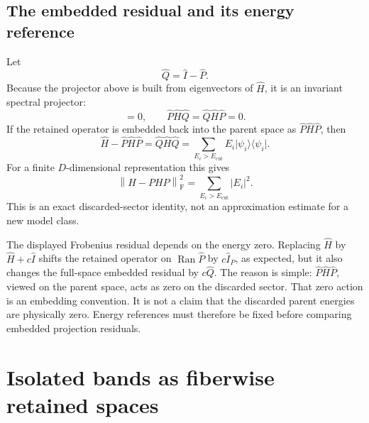 \subsection{The embedded residual and its energy reference}

Let
\begin{equation}
  \hat Q=\hat I-\hat P.
\end{equation}
Because the projector above is built from eigenvectors of \(\hat H\), it is an
invariant spectral projector:
\begin{equation}
  [\hat P,\hat H]=0,
  \qquad
  \hat P\hat H\hat Q=\hat Q\hat H\hat P=0.
\end{equation}
If the retained operator is embedded back into the parent space as
\(\hat P\hat H\hat P\), then
\begin{equation}
  \hat H-\hat P\hat H\hat P
  =\hat Q\hat H\hat Q
  =\sum_{E_i>E_{\mathrm{cut}}}
    E_i\lvert\psi_i\rangle\langle\psi_i\rvert.
\end{equation}
For a finite \(D\)-dimensional representation this gives
\begin{equation}
  \left\lVert H-PHP\right\rVert_{\mathrm F}^{2}
  =\sum_{E_i>E_{\mathrm{cut}}}|E_i|^{2}.
\end{equation}
This is an exact discarded-sector identity, not an approximation estimate for a
new model class.

The displayed Frobenius residual depends on the energy zero. Replacing
\(\hat H\) by \(\hat H+c\hat I\) shifts the retained operator on
\(\operatorname{Ran}\hat P\) by \(c\hat I_P\), as expected, but it also changes
the full-space embedded residual by \(c\hat Q\). The reason is simple:
\(\hat P\hat H\hat P\), viewed on the parent space, acts as zero on the
discarded sector. That zero action is an embedding convention. It is not a
claim that the discarded parent energies are physically zero. Energy references
must therefore be fixed before comparing embedded projection residuals.

\section{Isolated bands as fiberwise retained spaces}


